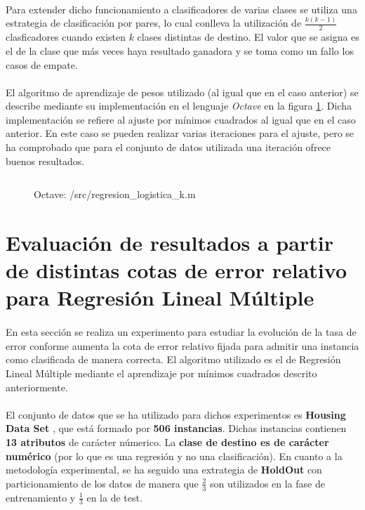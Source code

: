 \documentclass{article}
\begin{document}
			\paragraph{}
			Para extender dicho funcionamiento a clasificadores de varias clases se utiliza una estrategia de clasificación por pares, lo cual conlleva la utilización de $\frac{k(k-1)}{2}$ clasficadores cuando existen $k$ clases distintas de destino. El valor que se asigna es el de la clase que más veces haya resultado ganadora y se toma como un fallo los casos de empate.

			\paragraph{}
			El algoritmo de aprendizaje de pesos utilizado  (al igual que en el caso anterior) se describe mediante su implementación en el lenguaje \emph{Octave} en la figura \ref{code:logistic_regression}. Dicha implementación se refiere al ajuste por mínimos cuadrados al igual que en el caso anterior. En este caso se pueden realizar varias iteraciones para el ajuste, pero se ha comprobado que para el conjunto de datos utilizada una iteración ofrece buenos resultados.

			\begin{figure}[h]
				\centering
				\inputminted{octave}{./code/regresion_logistica_k.m}
				\caption{Octave: /src/regresion\_logistica\_k.m}
				\label{code:logistic_regression}
			\end{figure}



	\section{Evaluación de resultados a partir de distintas cotas de error relativo para Regresión Lineal Múltiple}
	\label{sec:e1}

		\paragraph{}
		En esta sección se realiza un experimento para estudiar la evolución de la tasa de error conforme aumenta la cota de error relativo fijada para admitir una instancia como clasificada de manera correcta. El algoritmo utilizado es el de Regresión Lineal Múltiple mediante el aprendizaje por mínimos cuadrados descrito anteriormente.

		\paragraph{}
		El conjunto de datos que se ha utilizado para dichos experimentos es \textbf{Housing Data Set} \cite{dataset:housing}, que está formado por \textbf{506 instancias}. Dichas instancias contienen \textbf{13 atributos} de carácter númerico. La \textbf{clase de destino es de carácter numérico} (por lo que es una regresión y no una clasificación). En cuanto a la metodología experimental, se ha seguido una extrategia de \textbf{HoldOut} con particionamiento de los datos de manera que $\frac{2}{3}$ son utilizados en la fase de entrenamiento y $\frac{1}{3}$ en la de test.
\end{document}
